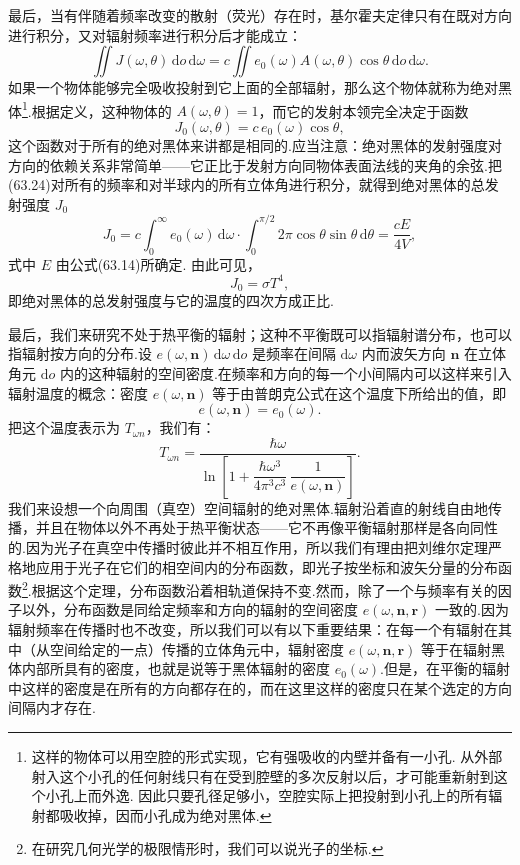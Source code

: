 最后，当有伴随着频率改变的散射（荧光）存在时，基尔霍夫定律只有在既对方向进行积分，又对辐射频率进行积分后才能成立：
\begin{equation}
  \iint J(\omega,\theta)\,\mathrm{d}o\,\mathrm{d}\omega
  =c\iint e_0(\omega)A(\omega,\theta)\cos\theta\,\mathrm{d}o\,\mathrm{d}\omega.
\end{equation}
如果一个物体能够完全吸收投射到它上面的全部辐射，那么这个物体就称为绝对黑体\footnote{这样的物体可以用空腔的形式实现，它有强吸收的内壁并备有一小孔. 从外部射入这个小孔的任何射线只有在受到腔壁的多次反射以后，才可能重新射到这个小孔上而外逸. 因此只要孔径足够小，空腔实际上把投射到小孔上的所有辐射都吸收掉，因而小孔成为绝对黑体.}.根据定义，这种物体的 $A(\omega,\theta)=1$，而它的发射本领完全决定于函数
\begin{equation}
  J_0(\omega,\theta)=c\,e_0(\omega)\cos\theta,
\end{equation}
这个函数对于所有的绝对黑体来讲都是相同的.应当注意：绝对黑体的发射强度对方向的依赖关系非常简单——它正比于发射方向同物体表面法线的夹角的余弦.把(63.24)对所有的频率和对半球内的所有立体角进行积分，就得到绝对黑体的总发射强度 $J_0$
\begin{equation*}
  J_0=c\int_0^{\infty}e_0(\omega)\,\mathrm{d}\omega\cdot
  \int_0^{\pi/2}2\pi\cos\theta\sin\theta\,\mathrm{d}\theta=\frac{cE}{4V},
\end{equation*}
式中 $E$ 由公式(63.14)所确定. 由此可见，
\begin{equation}
  J_0=\sigma T^4,
\end{equation}
即绝对黑体的总发射强度与它的温度的四次方成正比.

最后，我们来研究不处于热平衡的辐射；这种不平衡既可以指辐射谱分布，也可以指辐射按方向的分布.设 $e(\omega,\boldsymbol{n})\,\mathrm{d}\omega\,\mathrm{d}o$ 是频率在间隔 $\mathrm{d}\omega$ 内而波矢方向 $\boldsymbol{n}$ 在立体角元 $\mathrm{d}o$ 内的这种辐射的空间密度.在频率和方向的每一个小间隔内可以这样来引入辐射温度的概念：密度 $e(\omega,\boldsymbol{n})$ 等于由普朗克公式在这个温度下所给出的值，即
\begin{equation*}
  e(\omega,\boldsymbol{n})=e_0(\omega).
\end{equation*}
把这个温度表示为 $T_{\omega n}$，我们有：
\begin{equation}
  T_{\omega n}=\frac{\hbar\omega}
  {\ln\left[1+\dfrac{\hbar\omega^3}{4\pi^3c^3}\,
  \dfrac{1}{e(\omega,\boldsymbol{n})}\right]}.
\end{equation}
我们来设想一个向周围（真空）空间辐射的绝对黑体.辐射沿着直的射线自由地传播，并且在物体以外不再处于热平衡状态——它不再像平衡辐射那样是各向同性的.因为光子在真空中传播时彼此并不相互作用，所以我们有理由把刘维尔定理严格地应用于光子在它们的相空间内的分布函数，即光子按坐标和波矢分量的分布函数\footnote{在研究几何光学的极限情形时，我们可以说光子的坐标.}.根据这个定理，分布函数沿着相轨道保持不变.然而，除了一个与频率有关的因子以外，分布函数是同给定频率和方向的辐射的空间密度 $e(\omega,\boldsymbol{n},\boldsymbol{r})$ 一致的.因为辐射频率在传播时也不改变，所以我们可以有以下重要结果：在每一个有辐射在其中（从空间给定的一点）传播的立体角元中，辐射密度 $e(\omega,\boldsymbol{n},\boldsymbol{r})$ 等于在辐射黑体内部所具有的密度，也就是说等于黑体辐射的密度 $e_0(\omega)$.但是，在平衡的辐射中这样的密度是在所有的方向都存在的，而在这里这样的密度只在某个选定的方向间隔内才存在.

